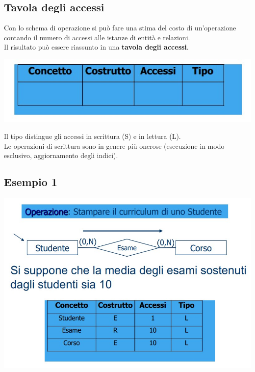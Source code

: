 \subsection{Tavola degli accessi}
Con lo schema di operazione si può fare una stima del costo di un'operazione contando il numero di accessi alle istanze di entità e relazioni.\\
Il risultato può essere riassunto in una \textbf{tavola degli accessi}.
\begin{center}
    \includegraphics[scale=0.675]{chaptersLezioniSara/img/PLog_tavolaAccessi1.jpg}
\end{center}
Il tipo distingue gli accessi in scrittura (S) e in lettura (L).\\
Le operazioni di scrittura sono in genere più onerose (esecuzione in modo esclusivo, aggiornamento degli indici).

\subsection{Esempio 1}
\begin{center}
    \includegraphics[scale=0.675]{chaptersLezioniSara/img/PLog_tavolaAccessi_es1.jpg}
\end{center}
